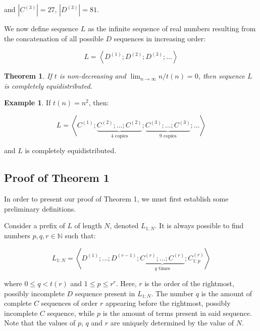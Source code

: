 \documentclass[11pt,a4paper]{tesis}
\theoremstyle{plain}
\newtheorem{theorem}{Theorem}
\theoremstyle{definition}
\newtheorem*{exmp*}{Example}
\begin{document}
and $|C^{(3)}| = 27$, $|D^{(3)}| = 81$.

We now define sequence $L$ as the infinite sequence of real numbers resulting from the concatenation of all possible $D$ sequences in increasing order:

\begin{equation*}
  L = \left< D^{(1)} ; D^{(2)} ;  D^{(3)} ; \dots \right>
\end{equation*}

\begin{theorem}\label{theorem:l-is-completely-equidistributed}
  If $t$ is non-decreasing and $\lim_{n \to \infty} n / t(n) = 0$, then sequence $L$ is completely equidistributed.
\end{theorem}

\begin{exmp*}
  If $t(n) = n^2$, then:

  \begin{equation*}
    L = \left< C^{(1)} ; \underbrace{C^{(2)} ; \dots ;  C^{(2)}}_{4 \text{ copies}} ;  \underbrace{C^{(3)} ; \dots ;  C^{(3)}}_{9 \text{ copies}} ; \dots \right>
  \end{equation*}

  and $L$ is completely equidistributed.
\end{exmp*}

\subsection{Proof of Theorem 1}\label{subsection:proof-of-theorem 1}

In order to present our proof of Theorem 1, we must first establish some preliminary definitions.

Consider a prefix of $L$ of length $N$, denoted $L_{1 : N}$. It is always possible to find numbers $p, q, r \in \mathbb{N}$ such that:

\begin{equation*}
  L_{1:N} = \left< D^{(1)} ; \dots ; D^{(r - 1)} ; \underbrace{C^{(r)} ; \dots ; C^{(r)}}_{q \text{ times}} ; C^{(r)}_{1:p} \right>
\end{equation*}

where $0 \le q < t(r)$ and $1 \le p \le r^r$. Here, $r$ is the order of the rightmost, possibly incomplete $D$ sequence present in $L_{1:N}$. The number $q$ is the amount of complete $C$ sequences of order $r$ appearing before the rightmost, possibly incomplete $C$ sequence, while $p$ is the amount of terms present in said sequence. Note that the values of $p$, $q$ and $r$ are uniquely determined by the value of $N$.
\end{document}
